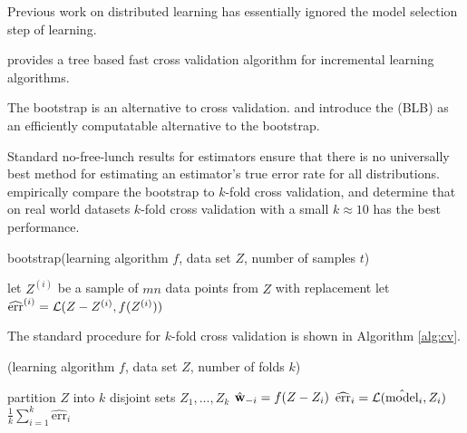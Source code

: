 \documentclass[thesis.tex]{subfiles}
\newcommand{\TO}{{\bfseries to}~}
\newcommand{\model}{\hat{\text{model}}}
\newcommand{\riskhat}{\widehat{\textrm{err}}}
\newcommand{\cv}{\mkprocedure{cv}}
\begin{document}

Previous work on distributed learning has essentially ignored the model selection step of learning.

\citet{joulani2015fast} provides a tree based fast cross validation algorithm for incremental learning algorithms.

The bootstrap is an alternative to cross validation.
\citet{kleiner2012big} and \citet{kleiner2014scalable} introduce the  (BLB) as an efficiently computatable alternative to the bootstrap.

Standard no-free-lunch results for estimators \citep[e.g. Chapter 8 of][]{shalev2014understanding} ensure that there is no universally best method for estimating an estimator's true error rate for all distributions.
\citet{kohavi1995study} empirically compare the bootstrap to $k$-fold cross validation,
and determine that on real world datasets $k$-fold cross validation with a small $k\approx10$ has the best performance.

\begin{algorithm}
    \caption{bootstrap(learning algorithm $f$, data set $Z$, number of samples $t$)}
    \vspace{0.1in}
    \begin{algorithmic}[1]
        \For {$i=1$ \TO $t$}
            \State let $Z^{(i)}$ be a sample of $mn$ data points from $Z$ with replacement
            \State let $\riskhat^{(i)} = \Loss(Z-Z^{(i)},f(Z^{(i)}))$
        \EndFor
        \State \Return
    \end{algorithmic}
\end{algorithm}

The standard procedure for $k$-fold cross validation is shown in Algorithm \ref{alg:cv}.
\begin{algorithm}
    \caption{\cv(learning algorithm $f$, data set $Z$, number of folds $k$)}
    \label{alg:cv}
    \vspace{0.1in}
    \begin{algorithmic}[1]
        \State partition $Z$ into $k$ disjoint sets $Z_1,...,Z_k$
            \State ${\hat{\mathbf w}}_{-i} = f(Z - Z_i)$ 
            \State $\riskhat_i = \Loss(\model_i,Z_i)$
        \EndFor
        \State \Return $\frac 1 k \sum_{i=1}^k \riskhat_i$
    \end{algorithmic}
\end{algorithm}
\end{document}
